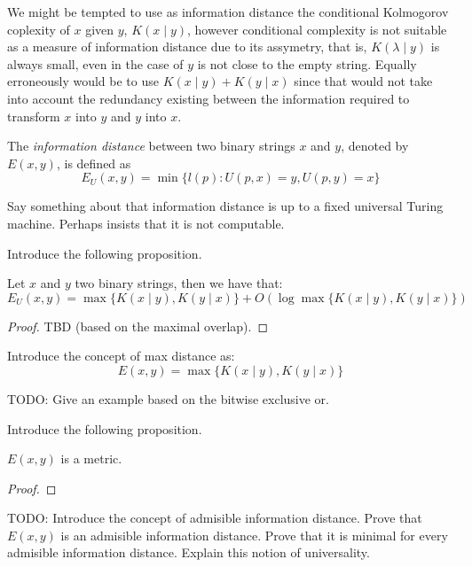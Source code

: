 We might be tempted to use as information distance the conditional Kolmogorov coplexity of $x$ given $y$, $K(x \mid y)$, however conditional complexity is not suitable as a measure of information distance due to its assymetry, that is, $K( \lambda \mid y)$ is always small, even in the case of $y$ is not close to the empty string. Equally erroneously would be to use $K(x \mid y) + K(y \mid x)$ since that would not take into account the redundancy existing between the information required to transform $x$ into $y$ and $y$ into $x$.

\begin{definition}
The \emph{information distance} between two binary strings $x$ and $y$, denoted by $E(x, y)$, is defined as
\[
E_U(x, y) = \min \{ l(p) : U(p, x) = y, U(p, y) = x \}
\]
\end{definition}

{\color{red} Say something about that information distance is up to a fixed universal Turing machine. Perhaps insists that it is not computable.}

{\color{red} Introduce the following proposition.}

\begin{proposition}
Let $x$ and $y$ two binary strings, then we have that:
\[
E_U(x, y) = \max\{ K(x \mid y), K(y \mid x) \} + O ( \log \max\{ K(x \mid y), K(y \mid x) \}) 
\]
\end{proposition}
\begin{proof}
{\color{red} TBD (based on the maximal overlap).}
\end{proof}

{\color{red} Introduce the concept of max distance as:}
\[
E(x, y) = \max\{ K(x \mid y), K(y \mid x) \}
\]

\begin{example}
{\color{red} TODO: Give an example based on the bitwise exclusive or.}
\end{example}

{\color{red} Introduce the following proposition.}

\begin{proposition}
{\color{red} $E(x, y)$ is a metric.}
\end{proposition}
\begin{proof}
\end{proof}

{\color{red} TODO: Introduce the concept of admisible information distance. Prove that $E(x, y)$ is an admisible information distance. Prove that it is minimal for every admisible information distance. Explain this notion of universality.}

